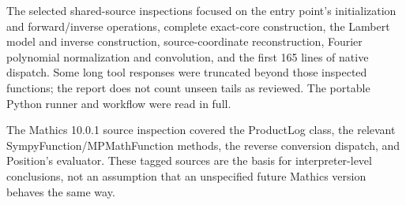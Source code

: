 \documentclass[11pt,a4paper]{article}
\begin{document}
The selected shared-source inspections focused on the entry point's initialization and forward/inverse operations, complete exact-core construction, the Lambert model and inverse construction, source-coordinate reconstruction, Fourier polynomial normalization and convolution, and the first 165 lines of native dispatch. Some long tool responses were truncated beyond those inspected functions; the report does not count unseen tails as reviewed. The portable Python runner and workflow were read in full.

The Mathics 10.0.1 source inspection covered the ProductLog class, the relevant SympyFunction/MPMathFunction methods, the reverse conversion dispatch, and Position's evaluator. These tagged sources are the basis for interpreter-level conclusions, not an assumption that an unspecified future Mathics version behaves the same way.
\end{document}
